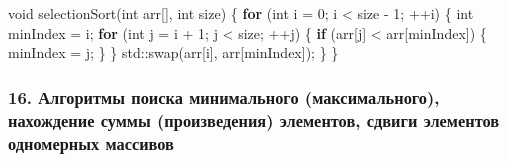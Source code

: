 \documentclass[
]{article}
\newenvironment{Shaded}{}{}
\newcommand{\BuiltInTok}[1]{\textcolor[rgb]{0.00,0.50,0.00}{#1}}
\newcommand{\ControlFlowTok}[1]{\textcolor[rgb]{0.00,0.44,0.13}{\textbf{#1}}}
\newcommand{\DataTypeTok}[1]{\textcolor[rgb]{0.56,0.13,0.00}{#1}}
\newcommand{\DecValTok}[1]{\textcolor[rgb]{0.25,0.63,0.44}{#1}}
\newcommand{\NormalTok}[1]{#1}
\newcommand{\OperatorTok}[1]{\textcolor[rgb]{0.40,0.40,0.40}{#1}}
\begin{document}
\begin{enumerate}
\begin{Shaded}
\begin{Highlighting}[]
\DataTypeTok{void}\NormalTok{ selectionSort}\OperatorTok{(}\DataTypeTok{int}\NormalTok{ arr}\OperatorTok{[],} \DataTypeTok{int}\NormalTok{ size}\OperatorTok{)} \OperatorTok{\{}
    \ControlFlowTok{for} \OperatorTok{(}\DataTypeTok{int}\NormalTok{ i }\OperatorTok{=} \DecValTok{0}\OperatorTok{;}\NormalTok{ i }\OperatorTok{\textless{}}\NormalTok{ size }\OperatorTok{{-}} \DecValTok{1}\OperatorTok{;} \OperatorTok{++}\NormalTok{i}\OperatorTok{)} \OperatorTok{\{}
        \DataTypeTok{int}\NormalTok{ minIndex }\OperatorTok{=}\NormalTok{ i}\OperatorTok{;}
        \ControlFlowTok{for} \OperatorTok{(}\DataTypeTok{int}\NormalTok{ j }\OperatorTok{=}\NormalTok{ i }\OperatorTok{+} \DecValTok{1}\OperatorTok{;}\NormalTok{ j }\OperatorTok{\textless{}}\NormalTok{ size}\OperatorTok{;} \OperatorTok{++}\NormalTok{j}\OperatorTok{)} \OperatorTok{\{}
            \ControlFlowTok{if} \OperatorTok{(}\NormalTok{arr}\OperatorTok{[}\NormalTok{j}\OperatorTok{]} \OperatorTok{\textless{}}\NormalTok{ arr}\OperatorTok{[}\NormalTok{minIndex}\OperatorTok{])} \OperatorTok{\{}
\NormalTok{                minIndex }\OperatorTok{=}\NormalTok{ j}\OperatorTok{;}
            \OperatorTok{\}}
        \OperatorTok{\}}
        \BuiltInTok{std::}\NormalTok{swap}\OperatorTok{(}\NormalTok{arr}\OperatorTok{[}\NormalTok{i}\OperatorTok{],}\NormalTok{ arr}\OperatorTok{[}\NormalTok{minIndex}\OperatorTok{]);}
    \OperatorTok{\}}
\OperatorTok{\}}
\end{Highlighting}
\end{Shaded}
\end{enumerate}

\subsubsection{16. Алгоритмы поиска минимального (максимального),
нахождение суммы (произведения) элементов, сдвиги элементов одномерных
массивов}\label{ux430ux43bux433ux43eux440ux438ux442ux43cux44b-ux43fux43eux438ux441ux43aux430-ux43cux438ux43dux438ux43cux430ux43bux44cux43dux43eux433ux43e-ux43cux430ux43aux441ux438ux43cux430ux43bux44cux43dux43eux433ux43e-ux43dux430ux445ux43eux436ux434ux435ux43dux438ux435-ux441ux443ux43cux43cux44b-ux43fux440ux43eux438ux437ux432ux435ux434ux435ux43dux438ux44f-ux44dux43bux435ux43cux435ux43dux442ux43eux432-ux441ux434ux432ux438ux433ux438-ux44dux43bux435ux43cux435ux43dux442ux43eux432-ux43eux434ux43dux43eux43cux435ux440ux43dux44bux445-ux43cux430ux441ux441ux438ux432ux43eux432}
\end{document}
